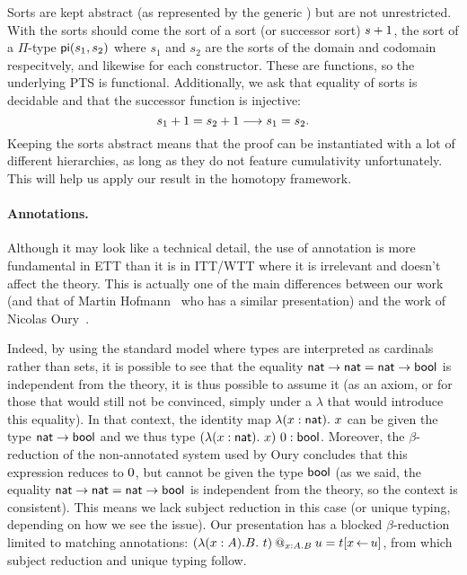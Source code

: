 Sorts are kept abstract (as represented by the generic \cS) but are not
unrestricted. With the sorts should come the sort of a sort (or successor
sort) \(s+1\), the sort of a \(\Pi\)-type \(\mathsf{pi}(s_1,s_2)\)
where \(s_1\) and \(s_2\) are the sorts of the domain and codomain respecitvely,
and likewise for each constructor.
These are functions, so the underlying \acrshort{PTS} is functional.
Additionally, we ask that equality of sorts is decidable and that the successor
function is injective:
\[
  s_1+1 = s_2+1 \longrightarrow s_1 = s_2.
\]
Keeping the sorts abstract means that the proof can be instantiated with a lot
of different hierarchies, as long as they do not feature cumulativity
unfortunately. This will help us apply our result in the homotopy framework.

\paragraph{Annotations.}

Although it may look like a technical detail, the use of annotation is more
fundamental in \acrshort{ETT} than it is in \acrshort{ITT}/\acrshort{WTT}
where it is irrelevant and doesn't affect the theory.
This is actually one of the main differences between our work
(and that of Martin Hofmann~ who has a
similar presentation) and the work of Nicolas
Oury~.

Indeed, by using the standard model where types are interpreted as
cardinals rather than sets, it is possible to see that the equality
$\mathsf{nat} \to \mathsf{nat} = \mathsf{nat} \to \mathsf{bool}$ is independent from the theory, it is
thus possible to assume it (as an axiom, or for those that would still
not be convinced, simply under a $\lambda$ that would introduce this
equality).  In that context, the identity map $\lambda(x : \mathsf{nat}).\ x$
can be given the type $\mathsf{nat} \to \mathsf{bool}$ and we thus type
$(\lambda(x : \mathsf{nat}).\ x)\ 0 : \mathsf{bool}$.  Moreover, the
$\beta$-reduction of the non-annotated system used by Oury concludes
that this expression reduces to $0$, but cannot be given the type
$\mathsf{bool}$ (as we said, the equality $\mathsf{nat} \to \mathsf{nat} = \mathsf{nat} \to \mathsf{bool}$ is
independent from the theory, so the context is consistent). This means
we lack subject reduction in this case (or unique typing,
depending on how we see the issue).  Our presentation has a blocked
$\beta$-reduction limited to matching annotations:
$(\lambda (x:A). B .\ t)\mathbin{@_{x:A.B}} u = t[x \mathop{\leftarrow} u]$, from which subject
reduction and unique typing follow.

